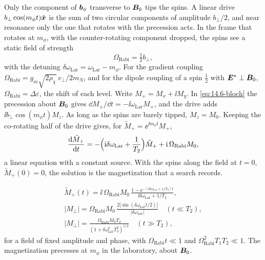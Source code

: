 Only the component of $\bm{b}_\phi$ transverse to $\bm{B}_0$ tips the spins. A linear drive $b_\perp\cos(m_\phi t)\hat{\bm{x}}$ is the sum of two circular components of amplitude $b_\perp/2$, and near resonance only the one that rotates with the precession acts. In the frame that rotates at $m_\phi$, with the counter-rotating component dropped, the spins see a static field of strength
\begin{equation*}
  \Omega_{\mathrm{Rabi}} = \tfrac12 b_\perp ,
\end{equation*}
with the detuning $\delta\omega_{\mathrm{Lar}} = \omega_{\mathrm{Lar}} - m_\phi$. For the gradient coupling $\Omega_{\mathrm{Rabi}} = g_{ai}\sqrt{2\rho_\chi}\,v_\perp/2m_N$, and for the dipole coupling of a spin $\frac12$ with $\bm{E}^*\perp\bm{B}_0$, $\Omega_{\mathrm{Rabi}} = \Delta\varepsilon$, the shift of each level. Write $M_+ = M_x + \ii M_y$. In \cref{eq:14.6-bloch} the precession about $\bm{B}_0$ gives $\dd M_+/\dd t = -\ii\omega_{\mathrm{Lar}}M_+$, and the drive adds $\ii b_\perp\cos(m_\phi t)M_z$. As long as the spins are barely tipped, $M_z = M_0$. Keeping the co-rotating half of the drive gives, for $\tilde M_+ = \ee^{\ii m_\phi t}M_+$,
\begin{equation*}
  \frac{\mathrm{d}\tilde M_+}{\mathrm{d} t} = -\Bigl(\mathrm{i}\delta\omega_{\mathrm{Lar}} + \frac{1}{T_2}\Bigr)\tilde M_+ + \mathrm{i}\,\Omega_{\mathrm{Rabi}}M_0 ,
\end{equation*}
a linear equation with a constant source. With the spins along the field at $t = 0$, $\tilde M_+(0) = 0$, the solution is the magnetization that a search records.
\begin{keyresult}
\begin{equation}
  \begin{gathered}
  \tilde M_+(t) = \ii\,\Omega_{\mathrm{Rabi}}M_0\,\frac{1 - \ee^{-(\ii\delta\omega_{\mathrm{Lar}} + 1/T_2)t}}{\ii\delta\omega_{\mathrm{Lar}} + 1/T_2} , \\
  |M_\perp| = \Omega_{\mathrm{Rabi}}M_0\,\frac{2|\sin(\delta\omega_{\mathrm{Lar}}t/2)|}{|\delta\omega_{\mathrm{Lar}}|}\quad(t \ll T_2), \\
  |M_\perp| = \frac{\Omega_{\mathrm{Rabi}}M_0T_2}{(1 + \delta\omega_{\mathrm{Lar}}^2T_2^2)^{1/2}}\quad(t \gg T_2),
  \end{gathered}
  \label{eq:14.6-mperp}
\end{equation}
for a field of fixed amplitude and phase, with $\Omega_{\mathrm{Rabi}}t \ll 1$ and $\Omega_{\mathrm{Rabi}}^2T_1T_2 \ll 1$. The magnetization precesses at $m_\phi$ in the laboratory, about $\bm{B}_0$.
\end{keyresult}
